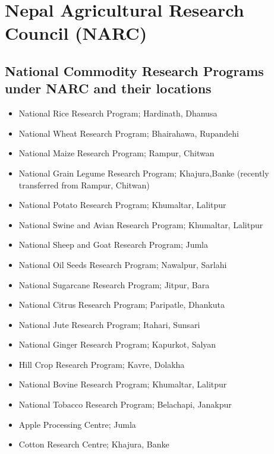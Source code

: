 \documentclass[
  openany]{book}
\providecommand{\tightlist}{%
  \setlength{\itemsep}{0pt}\setlength{\parskip}{0pt}}
\begin{document}
\hypertarget{nepal-agricultural-research-council-narc}{%
\section{Nepal Agricultural Research Council (NARC)}\label{nepal-agricultural-research-council-narc}}

\hypertarget{national-commodity-research-programs-under-narc-and-their-locations}{%
\subsection{National Commodity Research Programs under NARC and their locations}\label{national-commodity-research-programs-under-narc-and-their-locations}}

\begin{itemize}
\tightlist
\item
  National Rice Research Program; Hardinath, Dhanusa
\item
  National Wheat Research Program; Bhairahawa, Rupandehi
\item
  National Maize Research Program; Rampur, Chitwan
\item
  National Grain Legume Research Program; Khajura,Banke (recently transferred from Rampur, Chitwan)
\item
  National Potato Research Program; Khumaltar, Lalitpur
\item
  National Swine and Avian Research Program; Khumaltar, Lalitpur
\item
  National Sheep and Goat Research Program; Jumla
\item
  National Oil Seeds Research Program; Nawalpur, Sarlahi
\item
  National Sugarcane Research Program; Jitpur, Bara
\item
  National Citrus Research Program; Paripatle, Dhankuta
\item
  National Jute Research Program; Itahari, Sunsari
\item
  National Ginger Research Program; Kapurkot, Salyan
\item
  Hill Crop Research Program; Kavre, Dolakha
\item
  National Bovine Research Program; Khumaltar, Lalitpur
\item
  National Tobacco Research Program; Belachapi, Janakpur
\item
  Apple Processing Centre; Jumla
\item
  Cotton Research Centre; Khajura, Banke
\end{itemize}
\end{document}
